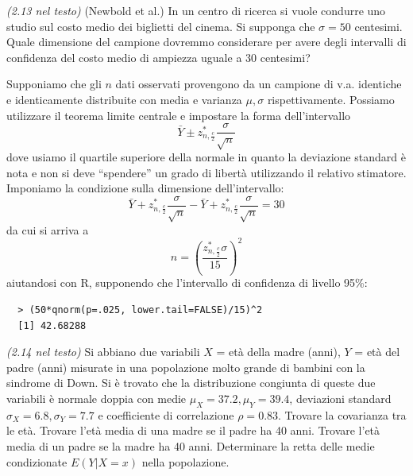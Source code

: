 \begin{exercise}{\emph{(2.13 nel testo)}}
  (Newbold et al.) In un centro di ricerca si vuole condurre uno
  studio sul costo medio dei biglietti del cinema. Si supponga che
  $\sigma = 50$ centesimi. Quale dimensione del campione dovremmo
  considerare per avere degli intervalli di confidenza del costo medio
  di ampiezza uguale a 30 centesimi?
\end{exercise}
Supponiamo che gli $n$ dati osservati provengono da un campione di
v.a. identiche e identicamente distribuite con media e varianza $\mu,
\sigma$ rispettivamente. Possiamo utilizzare il teorema limite
centrale e impostare la forma dell'intervallo $$\bar{Y} \pm
z_{n,\frac{c}{2}}^{*}\frac{\sigma}{\sqrt{n}}$$ dove usiamo il quartile
superiore della normale in quanto la deviazione standard \`e nota e
non si deve ``spendere'' un grado di libert\`a utilizzando il relativo
stimatore. Imponiamo la condizione sulla dimensione
dell'intervallo:$$\bar{Y} +
z_{n,\frac{c}{2}}^{*}\frac{\sigma}{\sqrt{n}} - \bar{Y} +
z_{n,\frac{c}{2}}^{*}\frac{\sigma}{\sqrt{n}} = 30$$ da cui si arriva
a $$n = \left (\frac{z_{n,\frac{c}{2}}^{*} \sigma}{15}\right )^2$$
aiutandosi con R, supponendo che l'intervallo di confidenza di livello 95\%:
\begin{lstlisting}
  > (50*qnorm(p=.025, lower.tail=FALSE)/15)^2
  [1] 42.68288
\end{lstlisting}

\begin{exercise}{\emph{(2.14 nel testo)}}
  Si abbiano due variabili $X$ = et\`a della madre (anni), $Y$ = et\`a
  del padre (anni) misurate in una popolazione molto grande di bambini
  con la sindrome di Down. Si \`e trovato che la distribuzione
  congiunta di queste due variabili \`e normale doppia con medie
  $\mu_X = 37.2, \mu_Y = 39.4$, deviazioni standard $\sigma_X = 6.8,
  \sigma_Y = 7.7$ e coefficiente di correlazione $\rho = 0.83$.
  Trovare la covarianza tra le et\`a. Trovare l'et\`a media di una
  madre se il padre ha 40 anni. Trovare l'et\`a media di un padre se
  la madre ha 40 anni. Determinare la retta delle medie condizionate
  $E(Y |X = x)$ nella popolazione.
\end{exercise}

